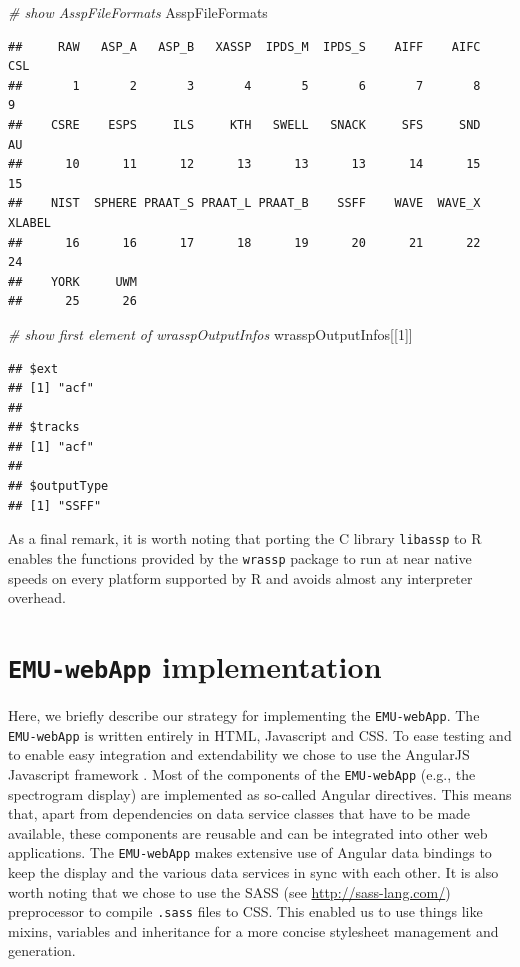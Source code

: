 \documentclass[]{book}
\newenvironment{Shaded}{\begin{snugshade}}{\end{snugshade}}
\newcommand{\CommentTok}[1]{\textcolor[rgb]{0.56,0.35,0.01}{\textit{#1}}}
\newcommand{\DecValTok}[1]{\textcolor[rgb]{0.00,0.00,0.81}{#1}}
\newcommand{\NormalTok}[1]{#1}
\begin{document}
\begin{Shaded}
\begin{Highlighting}[]
\CommentTok{# show AsspFileFormats}
\NormalTok{AsspFileFormats}
\end{Highlighting}
\end{Shaded}

\begin{verbatim}
##     RAW   ASP_A   ASP_B   XASSP  IPDS_M  IPDS_S    AIFF    AIFC     CSL 
##       1       2       3       4       5       6       7       8       9 
##    CSRE    ESPS     ILS     KTH   SWELL   SNACK     SFS     SND      AU 
##      10      11      12      13      13      13      14      15      15 
##    NIST  SPHERE PRAAT_S PRAAT_L PRAAT_B    SSFF    WAVE  WAVE_X  XLABEL 
##      16      16      17      18      19      20      21      22      24 
##    YORK     UWM 
##      25      26
\end{verbatim}

\begin{Shaded}
\begin{Highlighting}[]
\CommentTok{# show first element of wrasspOutputInfos}
\NormalTok{wrasspOutputInfos[[}\DecValTok{1}\NormalTok{]]}
\end{Highlighting}
\end{Shaded}

\begin{verbatim}
## $ext
## [1] "acf"
## 
## $tracks
## [1] "acf"
## 
## $outputType
## [1] "SSFF"
\end{verbatim}

As a final remark, it is worth noting that porting the C library \texttt{libassp} to R enables the functions provided by the \texttt{wrassp} package to run at near native speeds on every platform supported by R and avoids almost any interpreter overhead.

\hypertarget{chap:emu-webAppImplementation}{%
\chapter{\texorpdfstring{\texttt{EMU-webApp} implementation}{EMU-webApp implementation}}\label{chap:emu-webAppImplementation}}

Here, we briefly describe our strategy for implementing the \texttt{EMU-webApp}. The \texttt{EMU-webApp} is written entirely in HTML, Javascript and CSS. To ease testing and to enable easy integration and extendability we chose to use the AngularJS Javascript framework \citep{google:2014a}. Most of the components of the \texttt{EMU-webApp} (e.g., the spectrogram display) are implemented as so-called Angular directives. This means that, apart from dependencies on data service classes that have to be made available, these components are reusable and can be integrated into other web applications. The \texttt{EMU-webApp} makes extensive use of Angular data bindings to keep the display and the various data services in sync with each other. It is also worth noting that we chose to use the SASS (see \url{http://sass-lang.com/}) preprocessor to compile \texttt{.sass} files to CSS. This enabled us to use things like mixins, variables and inheritance for a more concise stylesheet management and generation.
\end{document}
